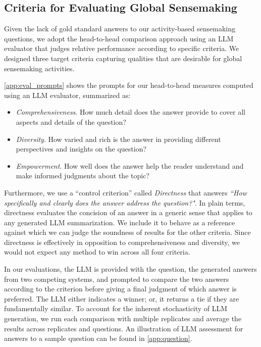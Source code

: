 \documentclass{article}
\begin{document}
\subsection{Criteria for Evaluating Global Sensemaking}
\label{sec:criteria}

Given the lack of gold standard answers to our activity-based sensemaking questions, we adopt the head-to-head comparison approach using an LLM evaluator that judges relative performance according to specific criteria.
We designed three target criteria capturing qualities that are desirable for global sensemaking activities.

\autoref{app:eval_prompts} shows the prompts for our head-to-head measures computed using an LLM evaluator, summarized as:
\begin{itemize}
    \item \emph{Comprehensiveness}. How much detail does the answer provide to cover all aspects and details of the question?
    \item \emph{Diversity}. How varied and rich is the answer in providing different perspectives and insights on the question?
    \item \emph{Empowerment}. How well does the answer help the reader understand and make informed judgments about the topic?
\end{itemize}

Furthermore, we use a ``control criterion'' called \emph{Directness} that answers \emph{``How specifically and clearly does the answer address the question?"}.
In plain terms, directness evaluates the concision of an answer in a generic sense that applies to any generated LLM summarization.
We include it to behave as a reference against which we can judge the soundness of results for the other criteria.
Since directness is effectively in opposition to comprehensiveness and diversity, we would not expect any method to win across all four criteria.

In our evaluations, the LLM is provided with the question, the generated answers from two competing systems, and prompted to compare the two answers according to the criterion before giving a final judgment of which answer is preferred. 
The LLM either indicates a winner; or, it returns a tie if they are fundamentally similar.
To account for the inherent stochasticity of LLM generation, we run each comparison with multiple replicates and average the results across replicates and questions.
An illustration of LLM assessment for answers to a sample question can be found in \autoref{app:question}.
\end{document}
